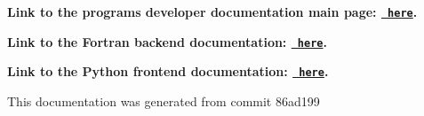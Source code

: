{\bfseries{Link to the program\textquotesingle{}s developer documentation main page\+: \href{https://joegilkes.github.io/PX915-Docs/}{\texttt{ here}}.}}

{\bfseries{Link to the Fortran backend documentation\+: \href{https://joegilkes.github.io/PX915-Docs/fortran/docs/index.html}{\texttt{ here}}.}}

{\bfseries{Link to the Python frontend documentation\+: \href{https://joegilkes.github.io/PX915-Docs/python/docs/index.html}{\texttt{ here}}.}}

This documentation was generated from commit 86ad199 